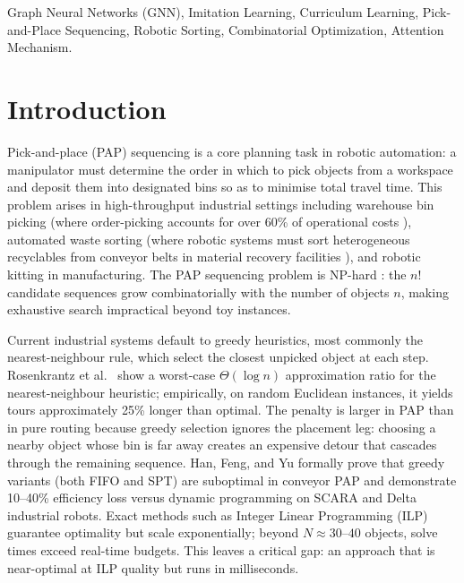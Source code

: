 \documentclass[conference]{IEEEtran}
\begin{document}
\begin{IEEEkeywords}
Graph Neural Networks (GNN), Imitation Learning, Curriculum Learning, Pick-and-Place Sequencing, Robotic Sorting, Combinatorial Optimization, Attention Mechanism.
\end{IEEEkeywords}

\section{Introduction}

Pick-and-place (PAP) sequencing is a core planning task in robotic automation: a manipulator must determine the order in which to pick objects from a workspace and deposit them into designated bins so as to minimise total travel time. This problem arises in high-throughput industrial settings including warehouse bin picking (where order-picking accounts for over 60\% of operational costs \cite{cheng2024drl}), automated waste sorting (where robotic systems must sort heterogeneous recyclables from conveyor belts in material recovery facilities \cite{gundupalli2020sequence}), and robotic kitting in manufacturing. The PAP sequencing problem is NP-hard \cite{chalasani1996}: the $n!$ candidate sequences grow combinatorially with the number of objects $n$, making exhaustive search impractical beyond toy instances.

Current industrial systems default to greedy heuristics, most commonly the nearest-neighbour rule, which select the closest unpicked object at each step. Rosenkrantz et al.\ \cite{rosenkrantz1977} show a worst-case $\Theta(\log n)$ approximation ratio for the nearest-neighbour heuristic; empirically, on random Euclidean instances, it yields tours approximately 25\% longer than optimal. The penalty is larger in PAP than in pure routing because greedy selection ignores the placement leg: choosing a nearby object whose bin is far away creates an expensive detour that cascades through the remaining sequence. Han, Feng, and Yu \cite{han2019pap} formally prove that greedy variants (both FIFO and SPT) are suboptimal in conveyor PAP and demonstrate 10--40\% efficiency loss versus dynamic programming on SCARA and Delta industrial robots. Exact methods such as Integer Linear Programming (ILP) guarantee optimality but scale exponentially; beyond $N \approx 30$--$40$ objects, solve times exceed real-time budgets. This leaves a critical gap: an approach that is near-optimal at ILP quality but runs in milliseconds.
\end{document}
